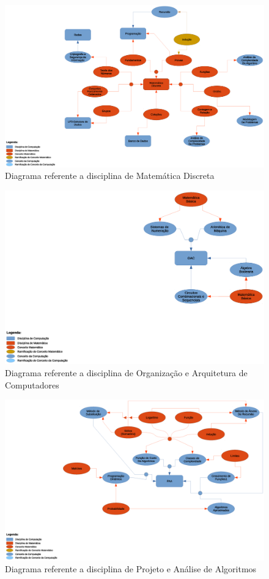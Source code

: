 \documentclass[12pt,a4paper]{article}
\begin{document}
\begin{figure}[htb]
	\centering
	\includegraphics[scale=0.35]{imagens/MD.eps} 
	\flushleft
	\caption{Diagrama referente a disciplina de Matemática Discreta}
	\label{fig:diagramaMD}
\end{figure}

\begin{figure}[htb]
	\centering
	\includegraphics[scale=0.35]{imagens/OAC.eps}
	\flushleft 
	\caption{Diagrama referente a disciplina de Organização e Arquitetura de Computadores}
	\label{fig:diagramaOAC}
\end{figure}

\begin{figure}[htb]
	\centering
	\includegraphics[scale=0.35]{imagens/PAA.eps} 
	\flushleft
	\caption{Diagrama referente a disciplina de Projeto e Análise de Algoritmos}
	\label{fig:diagramaPAA}
\end{figure}
\end{document}
